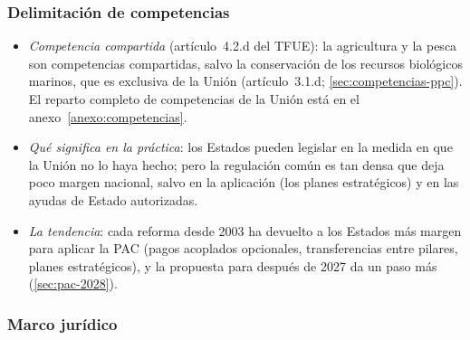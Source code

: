 \documentclass[11pt]{article}
\begin{document}
\subsubsection{Delimitación de competencias}\label{sec:competencias-pac}

\begin{itemize}
\item \emph{Competencia compartida} (artículo~4.2.d del TFUE): la agricultura y la pesca son competencias compartidas, salvo la conservación de los recursos biológicos marinos, que es exclusiva de la Unión (artículo~3.1.d; \ref{sec:competencias-ppc})\nocite{UE2016TFUE}. El reparto completo de competencias de la Unión está en el anexo~\ref{anexo:competencias}.
\item \emph{Qué significa en la práctica}: los Estados pueden legislar en la medida en que la Unión no lo haya hecho; pero la regulación común es tan densa que deja poco margen nacional, salvo en la aplicación (los planes estratégicos) y en las ayudas de Estado autorizadas.
\item \emph{La tendencia}: cada reforma desde 2003 ha devuelto a los Estados más margen para aplicar la PAC (pagos acoplados opcionales, transferencias entre pilares, planes estratégicos), y la propuesta para después de 2027 da un paso más (\ref{sec:pac-2028})\nocite{PE2026FichaInstrumentos}.
\end{itemize}

\subsubsection{Marco jurídico}\label{sec:marco-juridico-pac}
\end{document}
